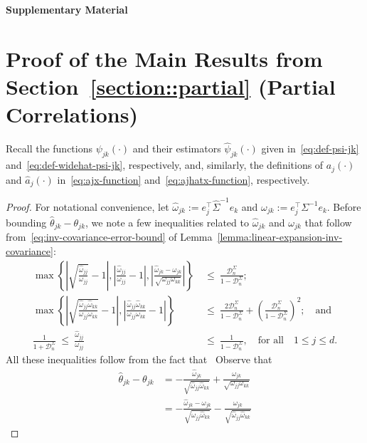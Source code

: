\documentclass{article}
\begin{document}
\newpage
\begin{appendices}
\begin{center}{\Large{\bf Supplementary Material}}
\end{center}
\section{Proof of the Main Results from Section~\ref{section::partial} (Partial Correlations)}
\label{appendix:main.partial}
Recall the functions $\psi_{jk}(\cdot)$ and their estimators $\widehat{\psi}_{jk}(\cdot)$ given in~\eqref{eq:def-psi-jk} and~\eqref{eq:def-widehat-psi-jk}, respectively, and, similarly, the definitions of $a_j(\cdot)$ and $\widehat{a}_j(\cdot)$
in~\eqref{eq:ajx-function} and~\eqref{eq:ajhatx-function}, respectively.
\begin{proof}
For notational convenience, let
$\widehat{\omega}_{jk} := e_j^{\top}\widehat{\Sigma}^{-1}e_k$ and $\omega_{jk} := e_j^{\top}\Sigma^{-1}e_k.$
Before bounding $\widehat{\theta}_{jk} - \theta_{jk}$, we note a few inequalities related to $\widehat{\omega}_{jk}$ and $\omega_{jk}$ that follow from~\eqref{eq:inv-covariance-error-bound} of Lemma~\ref{lemma:linear-expansion-inv-covariance}:
\begin{equation}\label{eq:inequalities-omegas}
\begin{split}
\max\left\{\left|\sqrt{\frac{\widehat{\omega}_{jj}}{\omega_{jj}}} - 1\right|, \left|\frac{\widehat{\omega}_{jj}}{\omega_{jj}} - 1\right|, \left|\frac{\widehat{\omega}_{jk} - \omega_{jk}}{\sqrt{\omega_{jj}\omega_{kk}}}\right|\right\} ~&\le~ \frac{\mathcal{D}_n^{\Sigma}}{1 - \mathcal{D}_n^{\Sigma}};\\ \max\left\{\left|\sqrt{\frac{\widehat{\omega}_{jj}\widehat{\omega}_{kk}}{\omega_{jj}\omega_{kk}}} - 1\right|, \left|\frac{\widehat{\omega}_{jj}\widehat{\omega}_{kk}}{\omega_{jj}\omega_{kk}} - 1\right|\right\} ~&\le~ \frac{2\mathcal{D}_n^{\Sigma}}{1 - \mathcal{D}_n^{\Sigma}} + \left(\frac{\mathcal{D}_n^{\Sigma}}{1 - \mathcal{D}_n^{\Sigma}}\right)^2;\quad\mbox{and}\\ \frac{1}{1 + \mathcal{D}_n^{\Sigma}} ~\le~ \frac{\widehat{\omega}_{jj}}{\omega_{jj}} ~&\le~ \frac{1}{1 - \mathcal{D}_n^{\Sigma}},\quad\mbox{for all}\quad 1\le j\le d.
\end{split}
\end{equation}
All these inequalities follow from the fact that
\ Observe that
\begin{align*}
\widehat{\theta}_{jk} - \theta_{jk} &= -\frac{\widehat{\omega}_{jk}}{\sqrt{\widehat{\omega}_{jj}\widehat{\omega}_{kk}}} + \frac{\omega_{jk}}{\sqrt{\omega_{jj}\omega_{kk}}}\\ &= -\frac{\widehat{\omega}_{jk} - \omega_{jk}}{\sqrt{\widehat{\omega}_{jj}\widehat{\omega}_{kk}}} - \frac{\omega_{jk}}{\sqrt{\widehat{\omega}_{jj}\widehat{\omega}_{kk}}}\left.

\end{align*}
\end{proof}
\end{appendices}
\end{document}
